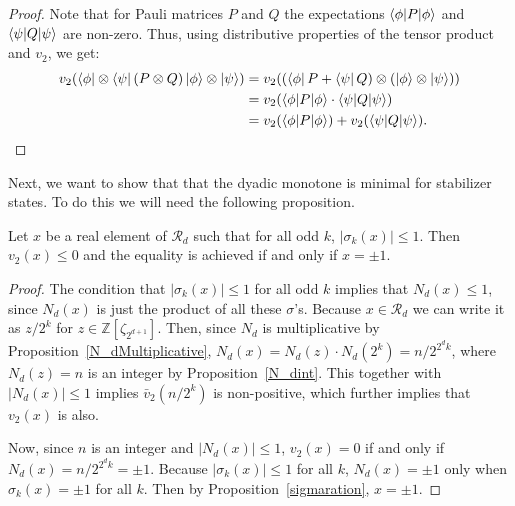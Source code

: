 \documentclass[12pt]{dalthesis}
\begin{document}
\begin{proof}
Note that for Pauli matrices $P$ and $Q$ the expectations $\braket{\phi | P |\phi}$ and $\braket{\psi | Q | \psi}$ are non-zero. Thus, using distributive properties of the tensor product and $v_2$, we get:
\begin{align*}
v_2 (\bra{\phi} \otimes \bra{\psi} (P \otimes Q) \ket{\phi} \otimes \ket{\psi}) & = v_2 ((\bra{\phi}P + \bra{\psi}Q) \otimes (\ket{\phi} \otimes \ket{\psi})) \\
& = v_2 (\braket{\phi | P | \phi} \cdot \braket{\psi | Q | \psi}) \\
& = v_2 (\braket{\phi | P | \phi}) + v_2(\braket{\psi | Q | \psi}).
\end{align*} \qedhere
\end{proof}

Next, we want to show that that the dyadic monotone is minimal for stabilizer states. To do this we will need the following proposition.

\begin{proposition}
\label{sigmak}
Let $x$ be a real element of $\mathcal{R}_d$ such that for all odd $k$, $|\sigma_k (x)| \leq 1$. Then $v_2(x) \leq 0$ and the equality is achieved if and only if $x = \pm 1$.
\end{proposition}
\begin{proof}
The condition that $|\sigma_k (x)| \leq 1$ for all odd $k$ implies that $N_d(x) \leq 1$, since $N_d(x)$ is just the product of all these $\sigma$'s. Because $x \in \mathcal{R}_d$ we can write it as $z/2^k$ for $z \in \mathbb{Z}[\zeta_{2^{d+1}}]$. Then, since $N_d$ is multiplicative by Proposition~\ref{N_dMultiplicative}, $N_d (x) = N_d(z) \cdot N_d(2^k) = n/2^{2^dk}$, where $N_d(z) = n$ is an integer by Proposition~\ref{N_dint}. This together with $|N_d(x)| \leq 1$ implies $\bar{v}_2 (n/2^k)$ is non-positive, which further implies that $v_2(x)$ is also. 

Now, since $n$ is an integer and $|N_d(x)| \leq 1$, $v_2(x) = 0$ if and only if $N_d(x) = n/2^{2^dk} = \pm 1$. Because $|\sigma_k (x)| \leq 1$ for all $k$, $N_d(x) = \pm 1$ only when $\sigma_k (x) = \pm 1$ for all $k$. Then by Proposition~\ref{sigmaration}, $x = \pm 1$.
\end{proof}
\end{document}
